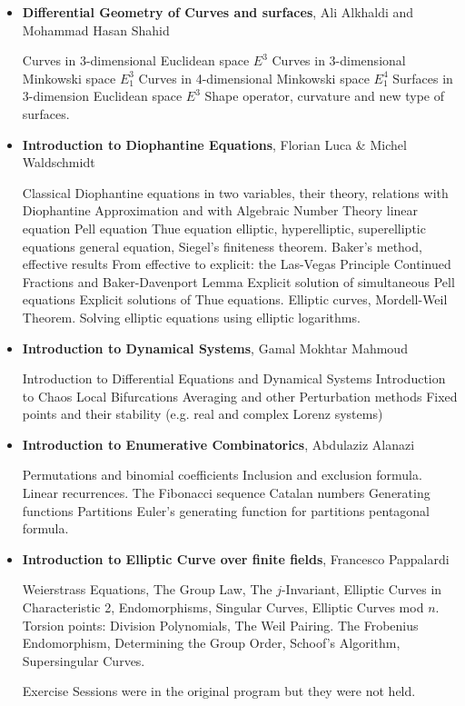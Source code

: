 \documentclass[12pt,a4paper]{scrartcl}
\begin{document}
\begin{itemize}

\item\textbf{Differential Geometry of Curves and surfaces},
Ali Alkhaldi and Mohammad Hasan Shahid\smallskip

    Curves in 3-dimensional Euclidean space $E^3$
    Curves in 3-dimensional Minkowski space $E^3_1$
    Curves in 4-dimensional Minkowski space $E^4_1$
    Surfaces in 3-dimension Euclidean space $E^3$
    Shape operator, curvature and new type of surfaces.

\item\textbf{Introduction to Diophantine Equations},
Florian Luca \& Michel Waldschmidt\smallskip

    Classical Diophantine equations in two variables, their theory, relations with Diophantine Approximation and with Algebraic Number Theory
        linear equation
        Pell equation
        Thue equation
        elliptic, hyperelliptic, superelliptic equations
        general equation, Siegel's finiteness theorem. 
    Baker's method, effective results
    From effective to explicit: the Las-Vegas Principle
    Continued Fractions and Baker-Davenport Lemma
    Explicit solution of simultaneous Pell equations
    Explicit solutions of Thue equations.
    Elliptic curves, Mordell-Weil Theorem. Solving elliptic equations using elliptic logarithms. 

\item\textbf{Introduction to Dynamical Systems},
Gamal Mokhtar Mahmoud\smallskip

    Introduction to Differential Equations and Dynamical Systems
    Introduction to Chaos
    Local Bifurcations
    Averaging and other Perturbation methods
    Fixed points and their stability (e.g. real and complex Lorenz systems) 

\item\textbf{Introduction to Enumerative Combinatorics},
Abdulaziz Alanazi\smallskip 

    Permutations and binomial coefficients
    Inclusion and exclusion formula.
    Linear recurrences. The Fibonacci sequence
    Catalan numbers
    Generating functions
    Partitions
    Euler's generating function for partitions
    pentagonal formula.

\item\textbf{Introduction to Elliptic Curve over finite fields},
Francesco Pappalardi\smallskip

    Weierstrass Equations, The Group Law,
    The $j$-Invariant,
    Elliptic Curves in Characteristic 2,
    Endomorphisms, Singular Curves, Elliptic Curves mod $n$.
    Torsion points: Division Polynomials,
    The Weil Pairing.
    The Frobenius Endomorphism,
    Determining the Group Order, Schoof's Algorithm, Supersingular Curves. 

Exercise Sessions were in the original program but they were not held.

\end{itemize}
\end{document}
